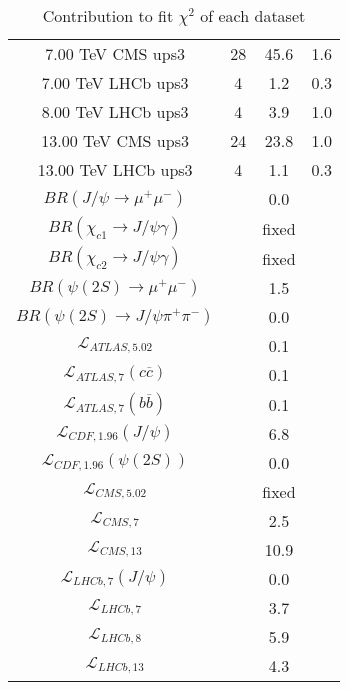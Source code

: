 \begin{table}[h!]
\begin{tabular}{c|c|c|c}
7.00 TeV CMS ups3 & 28 & 45.6 & 1.6 \\
7.00 TeV LHCb ups3 & 4 & 1.2 & 0.3 \\
8.00 TeV LHCb ups3 & 4 & 3.9 & 1.0 \\
13.00 TeV CMS ups3 & 24 & 23.8 & 1.0 \\
13.00 TeV LHCb ups3 & 4 & 1.1 & 0.3 \\
\hline
$BR(J/\psi\rightarrow\mu^+\mu^-)$ &  & 0.0 &  \\
$BR(\chi_{c1}\rightarrow J/\psi\gamma)$ &  & fixed & \\
$BR(\chi_{c2}\rightarrow J/\psi\gamma)$ &  & fixed & \\
$BR(\psi(2S)\rightarrow\mu^+\mu^-)$ &  & 1.5 &  \\
$BR(\psi(2S)\rightarrow J/\psi\pi^+\pi^-)$ &  & 0.0 &  \\
$\mathcal L_{ATLAS,5.02}$ &  & 0.1 &  \\
$\mathcal L_{ATLAS,7}(c\overline c)$ &  & 0.1 &  \\
$\mathcal L_{ATLAS,7}(b\overline b)$ &  & 0.1 &  \\
$\mathcal L_{CDF,1.96}(J/\psi)$ &  & 6.8 &  \\
$\mathcal L_{CDF,1.96}(\psi(2S))$ &  & 0.0 &  \\
$\mathcal L_{CMS,5.02}$ &  & fixed & \\
$\mathcal L_{CMS,7}$ &  & 2.5 &  \\
$\mathcal L_{CMS,13}$ &  & 10.9 &  \\
$\mathcal L_{LHCb,7}(J/\psi)$ &  & 0.0 &  \\
$\mathcal L_{LHCb,7}$ &  & 3.7 &  \\
$\mathcal L_{LHCb,8}$ &  & 5.9 &  \\
$\mathcal L_{LHCb,13}$ &  & 4.3 &  \\
\end{tabular}
\caption{Contribution to fit $\chi^2$ of each dataset}
\end{table}
